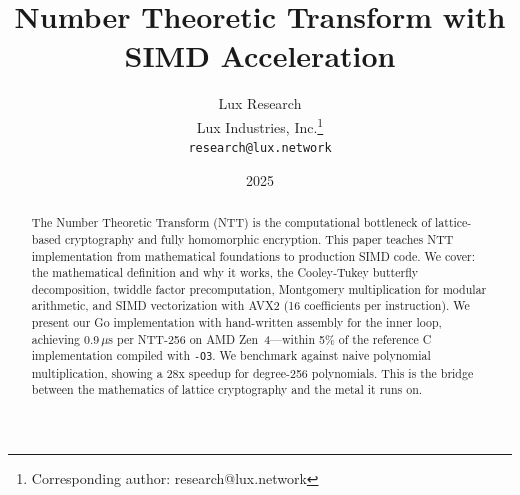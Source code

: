 \documentclass[11pt,a4paper]{article}
\title{Number Theoretic Transform with SIMD Acceleration}
\author{
Lux Research \\
Lux Industries, Inc.\thanks{Corresponding author: research@lux.network}\\
\texttt{research@lux.network}
}
\date{2025}
\begin{document}
\luxcoverpage

\begin{abstract}
The Number Theoretic Transform (NTT) is the computational bottleneck of lattice-based
cryptography and fully homomorphic encryption. This paper teaches NTT implementation from
mathematical foundations to production SIMD code. We cover: the mathematical definition
and why it works, the Cooley-Tukey butterfly decomposition, twiddle factor precomputation,
Montgomery multiplication for modular arithmetic, and SIMD vectorization with AVX2 (16
coefficients per instruction). We present our Go implementation with hand-written assembly
for the inner loop, achieving 0.9\,$\mu$s per NTT-256 on AMD Zen~4---within 5\% of the
reference C implementation compiled with \texttt{-O3}. We benchmark against naive polynomial
multiplication, showing a 28x speedup for degree-256 polynomials. This is the bridge between
the mathematics of lattice cryptography and the metal it runs on.
\end{abstract}

\tableofcontents
\newpage














\end{document}
